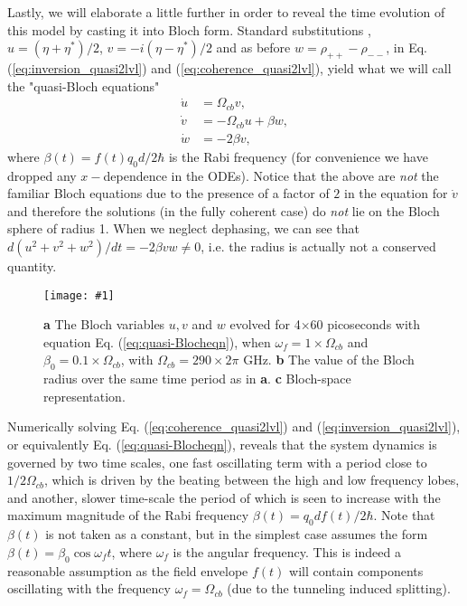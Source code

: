 \documentclass[]{spie}  %
\newcommand{\includegraphicsXL}[1]{\texttt{[image: \#1]}}
\begin{document}
Lastly, we will elaborate a little further in order to reveal the time evolution of this model by casting it into Bloch form. Standard substitutions \cite{boyd2003nonlinear}, $u=(\eta + \eta^*)/2$, $v = -i(\eta - \eta^*)/2$ and as before $w = \rho_{++}-\rho_{--}$, in Eq. (\ref{eq:inversion_quasi2lvl}) and (\ref{eq:coherence_quasi2lvl}), yield what we will call the "quasi-Bloch equations"
\begin{subequations}
	\label{eq:quasi-Blocheqn}
	\begin{align}
	\dot{u} &= \Omega_{cb} v , \\
	\dot{v} &= -\Omega_{cb} u +\beta w , \\
	\dot{w} &= -2\beta v,
	\end{align}
\end{subequations}
where $\beta(t) = f(t)q_0d/2\hbar$ is the Rabi frequency (for convenience we have dropped any $x-$dependence in the ODEs). Notice that the above are \emph{not} the familiar Bloch equations due to the presence of a factor of $2$ in the equation for $\dot{v}$ and therefore the solutions (in the fully coherent case) do \emph{not} lie on the Bloch sphere of radius 1. When we neglect dephasing, we can see that $d(u^2+v^2+w^2)/dt = -2\beta vw \neq 0$, i.e. the radius is actually not a conserved quantity.
\begin{figure}[h!]
	\begin{center}
		\includegraphicsXL{IMGS/quasi-bloch_resonance.eps}
		\caption{\textbf{a} The Bloch variables $u,v$ and $w$ evolved for 4$\times$60 picoseconds with equation Eq. (\ref{eq:quasi-Blocheqn}), when $\omega_f = 1\times\Omega_{cb}$ and $\beta_0 = 0.1\times\Omega_{cb}$, with $\Omega_{cb} = 290\times 2\pi$ GHz. \textbf{b} The value of the Bloch radius over the same time period as in \textbf{a}. \textbf{c} Bloch-space representation.} \label{fig:quasi-bloch-resonance}
	\end{center}	
\end{figure}
Numerically solving Eq. (\ref{eq:coherence_quasi2lvl}) and (\ref{eq:inversion_quasi2lvl}), or equivalently Eq. (\ref{eq:quasi-Blocheqn}), reveals that the system dynamics is governed by two time scales, one fast oscillating term with a period close to $1/2\Omega_{cb}$, which is driven by the beating between the high and low frequency lobes, and another, slower time-scale the period of which is seen to increase with the maximum magnitude of the Rabi frequency $\beta(t) = q_0df(t)/2\hbar$. Note that $\beta(t)$ is not taken as a constant, but in the simplest case assumes the form $\beta(t) = \beta_0 \cos\omega_f t$, where $\omega_f$ is  the angular frequency. This is indeed a reasonable assumption as the field envelope $f(t)$ will contain components oscillating with the frequency $\omega_f = \Omega_{cb}$ (due to the tunneling induced splitting). 
\end{document}
